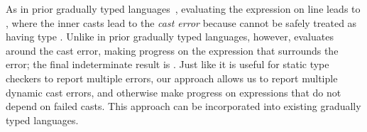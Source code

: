 \noindent
%
As in prior gradually typed languages~\cite{XXX},
evaluating the expression  on line  leads to
, where the inner casts
lead to the \emph{cast error}  because  cannot be
safely treated as having type .
%
Unlike in prior gradually typed languages, however, \HazelnutLive{} evaluates
around the cast error, making progress on the 
expression that surrounds the error; the final indeterminate result is
.
%
Just like it is useful for static type checkers to report multiple errors, our
approach allows us to report multiple dynamic cast errors, and otherwise make
progress on expressions that do not depend on failed casts.
%
This approach can be incorporated into existing gradually typed languages.
